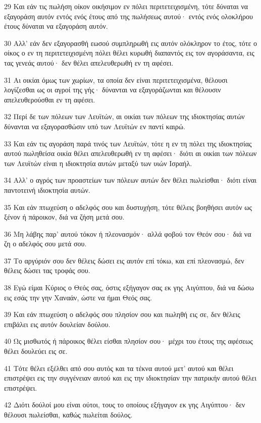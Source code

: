 \par 29 Και εάν τις πωλήση οίκον οικήσιμον εν πόλει περιτετειχισμένη, τότε δύναται να εξαγοράση αυτόν εντός ενός έτους από της πωλήσεως αυτού· εντός ενός ολοκλήρου έτους δύναται να εξαγοράση αυτόν.
\par 30 Αλλ' εάν δεν εξαγορασθή εωσού συμπληρωθή εις αυτόν ολόκληρον το έτος, τότε ο οίκος ο εν τη περιτετειχισμένη πόλει θέλει κυρωθή διαπαντός εις τον αγοράσαντα, εις τας γενεάς αυτού· δεν θέλει απελευθερωθή εν τη αφέσει.
\par 31 Αι οικίαι όμως των χωρίων, τα οποία δεν είναι περιτετειχισμένα, θέλουσι λογίζεσθαι ως οι αγροί της γής· δύνανται να εξαγοράζωνται και θέλουσιν απελευθερούσθαι εν τη αφέσει.
\par 32 Περί δε των πόλεων των Λευϊτών, αι οικίαι των πόλεων της ιδιοκτησίας αυτών δύνανται να εξαγορασθώσιν υπό των Λευϊτών εν παντί καιρώ.
\par 33 Και εάν τις αγοράση παρά τινός των Λευϊτών, τότε η εν τη πόλει της ιδιοκτησίας αυτού πωληθείσα οικία θέλει απελευθερωθή εν τη αφέσει· διότι αι οικίαι των πόλεων των Λευϊτών είναι η ιδιοκτησία αυτών μεταξύ των υιών Ισραήλ.
\par 34 Αλλ' ο αγρός των προαστείων των πόλεων αυτών δεν θέλει πωλείσθαι· διότι είναι παντοτεινή ιδιοκτησία αυτών.
\par 35 Και εάν πτωχεύση ο αδελφός σου και δυστυχήση, τότε θέλεις βοηθήσει αυτόν ως ξένον ή πάροικον, διά να ζήση μετά σου.
\par 36 Μη λάβης παρ' αυτού τόκον ή πλεονασμόν· αλλά φοβού τον Θεόν σου· διά να ζη ο αδελφός σου μετά σου.
\par 37 Το αργύριόν σου δεν θέλεις δώσει εις αυτόν επί τόκω, και επί πλεονασμώ, δεν θέλεις δώσει τας τροφάς σου.
\par 38 Εγώ είμαι Κύριος ο Θεός σας, όστις εξήγαγον σας εκ γης Αιγύπτου, διά να δώσω εις εσάς την γην Χαναάν, ώστε να ήμαι Θεός σας.
\par 39 Και εάν πτωχεύση ο αδελφός σου πλησίον σου και πωληθή εις σε, δεν θέλεις επιβάλει εις αυτόν δουλείαν δούλου.
\par 40 Ως μισθωτός ή πάροικος θέλει είσθαι πλησίον σου· μέχρι του έτους της αφέσεως θέλει δουλεύει εις σε.
\par 41 Τότε θέλει εξέλθει από σου αυτός και τα τέκνα αυτού μετ' αυτού και θέλει επιστρέψει εις την συγγένειαν αυτού και εις την ιδιοκτησίαν την πατρικήν αυτού θέλει επιστρέψει.
\par 42 Διότι δούλοί μου είναι ούτοι, τους το οποίους εξήγαγον εκ γης Αιγύπτου· δεν θέλουσι πωλείσθαι, καθώς πωλείται δούλος.
